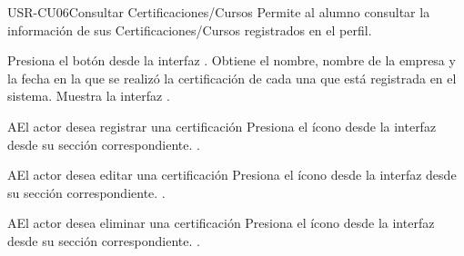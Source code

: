 \begin{UseCase}[]{USR-CU06}{Consultar Certificaciones/Cursos}{
	Permite al alumno consultar la información de sus Certificaciones/Cursos registrados en el perfil.
}
\end{UseCase}

\begin{UCtrayectoria}
	\UCpaso [\UCactor] Presiona el botón  desde la interfaz .
    \UCpaso [\UCsist] Obtiene el nombre, nombre de la empresa y la fecha en la que se realizó la certificación de cada una que está registrada en el sistema.
	\UCpaso [\UCsist] Muestra la interfaz .
\end{UCtrayectoria}

\begin{UCtrayectoriaA}{A}{El actor desea registrar una certificación}
	\UCpaso [\UCsist] Presiona el ícono \IUAgregar{} desde la interfaz  desde su sección correspondiente.
	.
\end{UCtrayectoriaA} 

\begin{UCtrayectoriaA}{A}{El actor desea editar una certificación}
	\UCpaso [\UCsist] Presiona el ícono \IUEditar{} desde la interfaz  desde su sección correspondiente.
	.
\end{UCtrayectoriaA} 

\begin{UCtrayectoriaA}{A}{El actor desea eliminar una certificación}
	\UCpaso [\UCsist] Presiona el ícono \IUEliminar{} desde la interfaz  desde su sección correspondiente.
	.
\end{UCtrayectoriaA} 